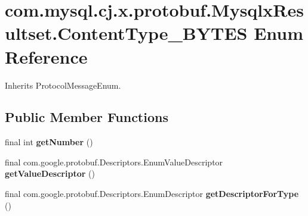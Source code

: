 \hypertarget{enumcom_1_1mysql_1_1cj_1_1x_1_1protobuf_1_1_mysqlx_resultset_1_1_content_type___b_y_t_e_s}{}\section{com.\+mysql.\+cj.\+x.\+protobuf.\+Mysqlx\+Resultset.\+Content\+Type\+\_\+\+B\+Y\+T\+ES Enum Reference}
\label{enumcom_1_1mysql_1_1cj_1_1x_1_1protobuf_1_1_mysqlx_resultset_1_1_content_type___b_y_t_e_s}


Inherits Protocol\+Message\+Enum.

\subsection*{Public Member Functions}
\begin{DoxyCompactItemize}
\item 
\mbox{\label{enumcom_1_1mysql_1_1cj_1_1x_1_1protobuf_1_1_mysqlx_resultset_1_1_content_type___b_y_t_e_s_a29b28a68964405f86d49e810e595f98d}} 
final int {\bfseries get\+Number} ()
\item 
\mbox{\label{enumcom_1_1mysql_1_1cj_1_1x_1_1protobuf_1_1_mysqlx_resultset_1_1_content_type___b_y_t_e_s_ade1ad581ba0cf23545afe1acde306394}} 
final com.\+google.\+protobuf.\+Descriptors.\+Enum\+Value\+Descriptor {\bfseries get\+Value\+Descriptor} ()
\item 
\mbox{\label{enumcom_1_1mysql_1_1cj_1_1x_1_1protobuf_1_1_mysqlx_resultset_1_1_content_type___b_y_t_e_s_a1b4bb6cd013a284d02805ee92772d8ef}} 
final com.\+google.\+protobuf.\+Descriptors.\+Enum\+Descriptor {\bfseries get\+Descriptor\+For\+Type} ()
\end{DoxyCompactItemize}
